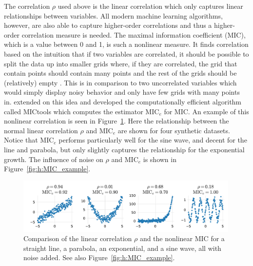 The correlation $\rho$ used above is the linear correlation which only captures linear relationships between variables. All modern machine learning algorithms, however, are also able to capture higher-order correlations and thus a higher-order correlation measure is needed. The maximal information coefficient (MIC), which is a value between \num{0} and \num{1}, is such a nonlinear measure. It finds correlation based on the intuition that if two variables are correlated, it should be possible to split the data up into smaller grids where, if they are correlated, the grid that contain points should contain many points and the rest of the grids should be (relatively) empty \autocite{reshefDetectingNovelAssociations2011}. This is in comparison to two uncorrelated variables which would simply display noisy behavior and only have few grids with many points in. \citet{albanesePracticalToolMaximal2018a} extended on this idea and developed the computationally efficient algorithm called MICtools which computes the estimator $\mathrm{MIC}_e$ for MIC. An example of this nonlinear correlation is seen in Figure~\ref{fig:h:MIC_example_small}. Here the relationship between the normal linear correlation $\rho$ and $\mathrm{MIC}_e$ are shown for four synthetic datasets. Notice that $\mathrm{MIC}_e$ performs particularly well for the sine wave, and decent for the line and parabola, but only slightly captures the relationship for the exponential growth. The influence of noise on $\rho$ and $\mathrm{MIC}_e$ is shown in Figure~\ref{fig:h:MIC_example}. 

\begin{figure}
  \centerfloat
  \includegraphics[width=0.99\textwidth, trim=10 10 10 10, clip]{figures/housing/MIC_test_small.pdf}
  \caption[Comparison of the Linear Correlation $\rho$ and the Nonlinear MIC]
          {Comparison of the linear correlation $\rho$ and the nonlinear MIC for a straight line, a parabola, an exponential, and a sine wave, all with noise added. See also Figure~\ref{fig:h:MIC_example}.}
  \label{fig:h:MIC_example_small}
\end{figure}

